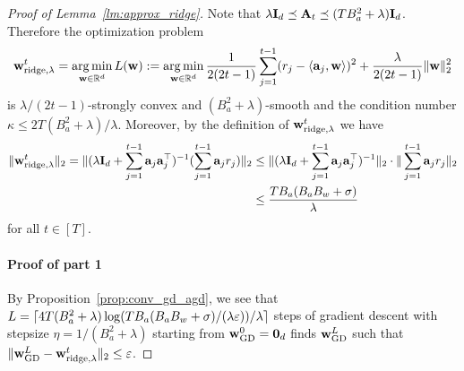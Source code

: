 \begin{proof}[Proof of Lemma~\ref{lm:approx_ridge}]
Note that $\lambda{\mathbf I}_d\preceq {\mathbf A}_t\preceq (TB_a^2+\lambda){\mathbf I}_d$. Therefore the optimization problem
$${\mathbf w}^t_{{\rm ridge},\lambda}=\operatorname*{arg\,min}_{{\mathbf w}\in\mathbb{R}^d}L({\mathbf w}):=\operatorname*{arg\,min}_{{\mathbf w}\in\mathbb{R}^d}\frac{1}{2(2t-1)}\sum_{j=1}^{t-1}(r_j-\left\langle{\mathbf a}_j,{\mathbf w}\right\rangle)^2+\frac{\lambda}{2(2t-1)}\|{\mathbf w}\|_2^2$$
is $\lambda/(2t-1)$-strongly convex  and $(B_a^2+\lambda)$-smooth and the condition number $\kappa\leq 2T(B_a^2+\lambda)/\lambda$. Moreover, by the definition of ${\mathbf w}_{{\rm ridge},\lambda}^t$ we have
\begin{align*}
    \|{\mathbf w}^t_{{\rm ridge},\lambda}\|_2=\|(\lambda{\mathbf I}_d+\sum_{j=1}^{t-1}{\mathbf a}_j{\mathbf a}_j^\top)^{-1}(\sum_{j=1}^{t-1}{\mathbf a}_jr_j)\|_2&\leq
    \|(\lambda{\mathbf I}_d+\sum_{j=1}^{t-1}{\mathbf a}_j{\mathbf a}_j^\top)^{-1}\|_2\cdot\|\sum_{j=1}^{t-1}{\mathbf a}_jr_j\|_2\\&\leq
    \frac{TB_a(B_aB_w+\sigma)}{\lambda}
\end{align*}
for all $t\in[T]$.
\paragraph{Proof of part 1}
By Proposition~\ref{prop:conv_gd_agd}, we see that $L=\lceil4T(B_a^2+\lambda)\log({TB_a(B_aB_w+\sigma)}/({\lambda}\varepsilon))/\lambda\rceil$ steps of gradient descent with stepsize $\eta=1/(B_a^2+\lambda)$ starting from ${\mathbf w}_{{\mathrm{GD}}}^0={\mathbf 0}_d$ finds ${\mathbf w}^L_{\mathrm{GD}}$ such that $\|{\mathbf w}^L_{{\mathrm{GD}}}-{\mathbf w}^t_{{\rm ridge},\lambda}\|_2\leq\varepsilon$.


\end{proof}
